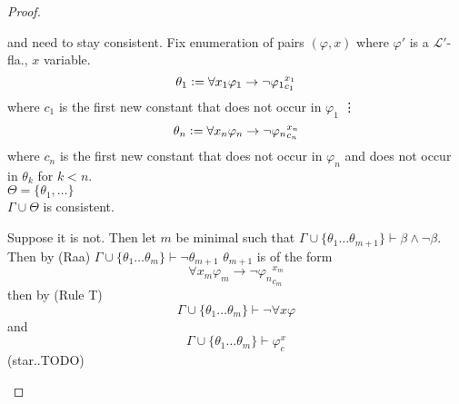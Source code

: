 \begin{proof}
\begin{enumerate}
        and need to stay consistent. Fix enumeration of pairs $(\varphi, x)$ where $\varphi'$ is a $\mathcal{L}'$-fla., $x$ variable.
        $$\theta_1 \vcentcolon= \forall x_1 \varphi_1 \to \lnot{\varphi_1}^{x_1}_{c_1}$$
        where $c_1$ is the first new constant that does not occur in $\varphi_1$
        \vdots
        $$\theta_n \vcentcolon= \forall x_n \varphi_n \to \lnot{\varphi_n}^{x_n}_{c_n}$$
        where $c_n$ is the first new constant that does not occur in $\varphi_n$ and does not occur in $\theta_k$ for $k<n$.\\
        $\Theta = \{\theta_1,\dots \}$\\
         $\Gamma \cup \Theta$ is consistent.
        \begin{claimproof}
            Suppose it is not. Then let $m$ be minimal such that $\Gamma\cup \{\theta_1 \dots \theta_{m+1}\}\vdash \beta \land \lnot \beta$.
            Then by (Raa) $\Gamma\cup \{\theta_1 \dots \theta_{m}\}\vdash \lnot \theta_{m+1}$
            $\theta_{m+1}$ is of the form $$\forall x_m \varphi_m \to \lnot{\varphi_n}^{x_m}_{c_m}$$
            then by (Rule T) $$\Gamma\cup \{\theta_1 \dots \theta_{m}\}\vdash \lnot \forall x \varphi$$ and 
            $$\Gamma\cup \{\theta_1 \dots \theta_{m}\}\vdash \varphi_c^x$$ (star..TODO)
            

\end{claimproof}
\end{enumerate}
\end{proof}
